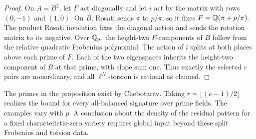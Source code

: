 \begin{proof}
On \(A=B^2\), let \(F\) act diagonally and let \(i\) act by
the matrix with rows \((0,-1)\) and \((1,0)\).
On \(B\), Rosati sends \(\pi\) to \(p/\pi\), so it fixes
\(F=\mathbb Q(\pi+p/\pi)\). The product Rosati involution fixes the
diagonal action and sends the rotation matrix to its negative.
Over \(\mathbb Q_p\), the height-two \(F\)-components of \(B\)
follow from the relative quadratic Frobenius polynomial.
The action of \(i\) splits at both places above each prime of \(F\).
Each of the two eigenspaces inherits the height-two component
of \(B\) at that prime, with slope sum one. Thus exactly
the selected \(r\) pairs are nonordinary, and all \(\ell^N\)-torsion
is rational as claimed.
\end{proof}

The primes in the proposition exist by Chebotarev. Taking
\(r=\lfloor(e-1)/2\rfloor\) realizes the bound for every all-balanced
signature over prime fields. The examples vary with \(p\).
A conclusion about the density of the residual pattern for a fixed
characteristic-zero variety requires global input beyond these
split Frobenius and torsion data.

